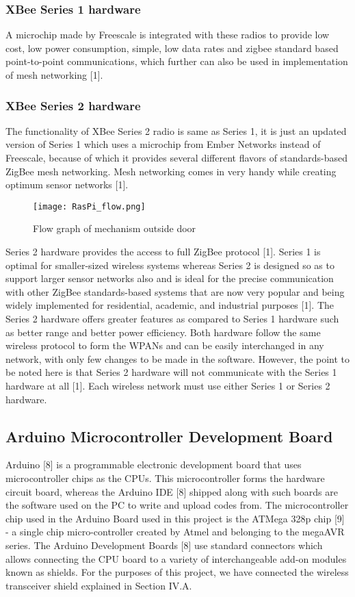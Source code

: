 \documentclass[letterpaper, 10 pt, conference]{ieeeconf}
\begin{document}
\subsubsection{XBee Series 1 hardware}
A microchip made by Freescale is integrated with these radios to provide low cost, low power consumption, simple, low data rates and zigbee standard based point-to-point communications, which further can also be used in implementation of mesh networking [1].
\subsubsection{XBee Series 2 hardware}
The functionality of XBee Series 2 radio is same as Series 1, it is just an updated version of Series 1 which uses a microchip from Ember Networks instead of Freescale, because of which it provides several different flavors of standards-based ZigBee mesh networking. Mesh networking comes in very handy while creating optimum sensor networks [1].
\begin{figure}[h!]
\centering
\texttt{[image: RasPi\_flow.png]}
\caption{\label{fig:ipfinal}Flow graph of mechanism outside door}
\end{figure}

Series 2 hardware provides the access to full ZigBee protocol [1]. Series 1 is optimal for smaller-sized wireless systems whereas Series 2 is designed so as to support larger sensor networks also and is ideal for the precise communication with other ZigBee standards-based systems that are now very popular and being widely implemented for residential, academic, and industrial purposes [1]. The Series 2 hardware offers greater features as compared to Series 1 hardware such as better range and better power efficiency. Both hardware follow the same wireless protocol to form the WPANs and can be easily interchanged in any network, with only few changes to be made in the software. However, the point to be noted here is that Series 2 hardware will not communicate with the Series 1 hardware at all [1]. Each wireless network must use either Series 1 or Series 2 hardware. 

\subsection{Arduino Microcontroller Development Board}
Arduino [8] is a programmable electronic development board that uses microcontroller chips as the CPUs. This microcontroller forms the hardware circuit board, whereas the Arduino IDE [8] shipped along with such boards are the software used on the PC to write and upload codes from. The microcontroller chip used in the Arduino Board used in this project is the ATMega 328p chip [9] - a single chip micro-controller created by Atmel and belonging to the megaAVR series. The Arduino Development Boards [8] use standard connectors which allows connecting the CPU board to a variety of interchangeable add-on modules known as shields. For the purposes of this project, we have connected the wireless transceiver shield explained in Section IV.A.
\end{document}
